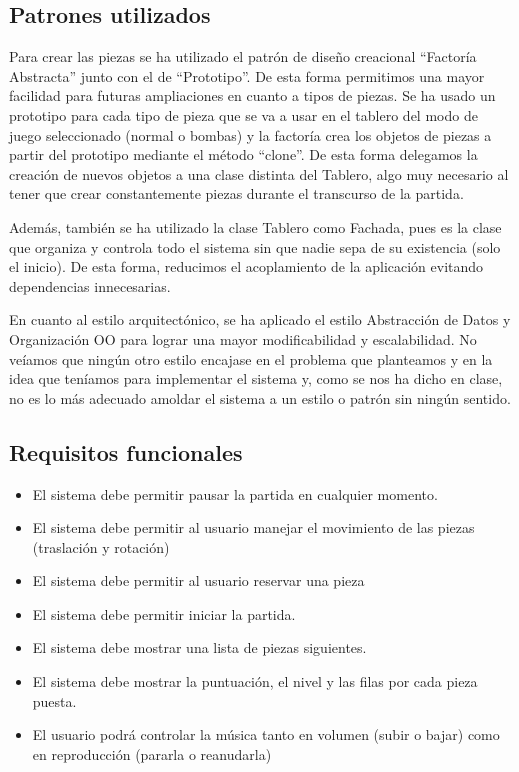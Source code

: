 \documentclass{article}
\begin{document}
\subsection{Patrones utilizados}
Para crear las piezas se ha utilizado el patrón de diseño creacional
 ``Factoría Abstracta'' junto con el de ``Prototipo''. De esta forma permitimos
 una mayor facilidad para futuras ampliaciones en cuanto a tipos de piezas.
Se ha usado un prototipo para cada tipo de pieza que se va a usar en el tablero del
modo de juego seleccionado (normal o bombas) y la factoría crea los objetos de piezas
 a partir del prototipo mediante el método ``clone''. De esta forma delegamos la
 creación de nuevos objetos a una clase distinta del Tablero, algo muy necesario
 al tener que crear constantemente piezas durante el transcurso de la partida.

 Además, también se ha utilizado la clase Tablero como Fachada, pues es la clase que
 organiza y controla todo el sistema sin que nadie sepa de su existencia (solo el inicio).
 De esta forma, reducimos el acoplamiento de la aplicación evitando dependencias
 innecesarias.

En cuanto al estilo arquitectónico, se ha aplicado el estilo Abstracción de Datos
y Organización OO para lograr una mayor modificabilidad y escalabilidad. No veíamos que
 ningún otro estilo encajase en el problema que planteamos y en la idea que teníamos para
 implementar el sistema y, como se nos ha dicho en clase, no es lo más adecuado
 amoldar el sistema a un estilo o patrón sin ningún sentido.


\subsection{Requisitos funcionales}
\begin{itemize}
    \item El sistema debe permitir pausar la partida en cualquier
    momento.
    \item El sistema debe permitir al usuario manejar el movimiento de
    las piezas (traslación y rotación)
    \item El sistema debe permitir al usuario reservar una pieza
    \item El sistema debe permitir iniciar la partida.
    \item El sistema debe mostrar una lista de piezas siguientes.
    \item El sistema debe mostrar la puntuación, el nivel y las filas por cada pieza puesta.
    \item El usuario podrá controlar la música tanto en volumen (subir o bajar) como en reproducción (pararla o reanudarla)
\end{itemize}
\end{document}
